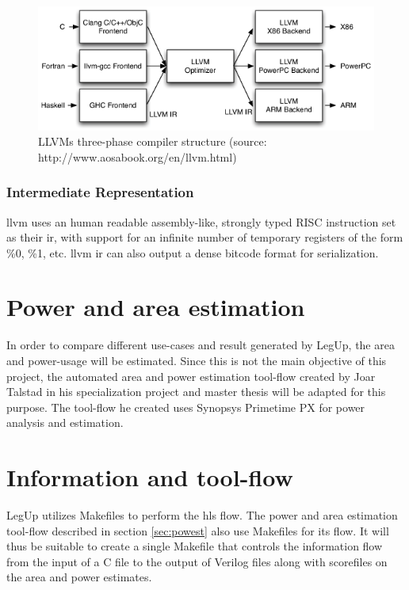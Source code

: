 \begin{figure}[hbpt]
\centering
\includegraphics[width=\textwidth]{../figs/LLVMCompiler.png}
\caption{\label{fig:llvmcompiler}LLVMs three-phase compiler structure (source: http://www.aosabook.org/en/llvm.html)}
\end{figure}
\subsubsection{Intermediate Representation}

\gls{llvm} uses an human readable assembly-like, strongly typed RISC instruction set as their \gls{ir}, with support for an infinite number of temporary registers of the form \%0, \%1, etc. \gls{llvm} \gls{ir} can also output a dense bitcode format for serialization.

\section{\label{sec:powest}Power and area estimation}

In order to compare different use-cases and result generated by LegUp, the area and power-usage will be estimated. Since this is not the main objective of this project, the automated area and power estimation tool-flow created by Joar Talstad in his specialization project \cite{talstad14project} and master thesis \cite{talstad15master} will be adapted for this purpose. The tool-flow he created uses Synopsys Primetime PX for power analysis and estimation.

\section{Information and tool-flow}
LegUp utilizes Makefiles to perform the \gls{hls} flow. The power and area estimation tool-flow described in section \ref{sec:powest} also use Makefiles for its flow. It will thus be suitable to create a single Makefile that controls the information flow from the input of a C file to the output of Verilog files along with scorefiles on the area and power estimates. 